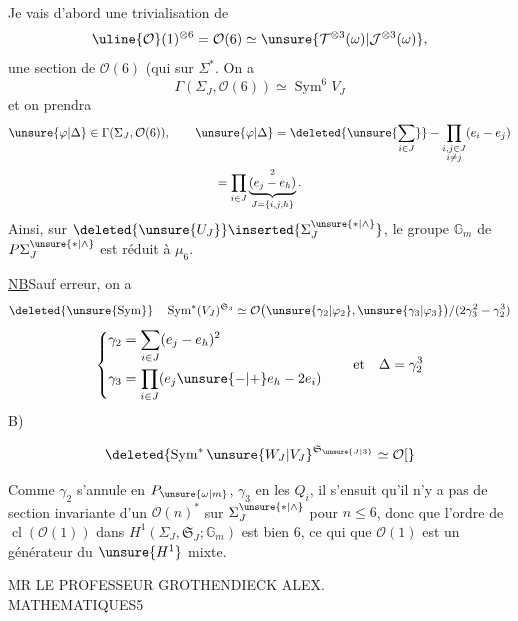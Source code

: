 Je vais d'abord  une trivialisation de
\[
\uline{\mathcal O}(1)^{\otimes6}=\mathcal O(6)\simeq
\unsure{\mathcal T^{\otimes3}(\omega)|\mathcal J^{\otimes3}(\omega)},
\]
  une section de $\mathcal O(6)$
(qui 
 sur $\Sigma^*$.
On  a
\[
\Gamma(\Sigma_J,\mathcal O(6))\simeq\operatorname{Sym}^{6}V_J
\]
et on prendra
\[
\begin{gathered}
\unsure{\varphi|\Delta}\in\Gamma(\Sigma_J,\mathcal O(6)),\qquad
\unsure{\varphi|\Delta}
=\deleted{\unsure{\sum_{i\in J}}}
-\prod_{\substack{i,j\in J\\i\ne j}}(e_i-e_j)\\
=\prod_{i\in J}\underbrace{(e_j-e_h)}_{J=\{i,j,h\}}^{2}.
\end{gathered}
\]
Ainsi, sur $\deleted{\unsure{U_J}}\inserted{\Sigma_J^{\unsure{*|\wedge}}}$, le groupe 
$\mathbb G_m$ de $P\Sigma_J^{\unsure{*|\wedge}}$ est réduit à $\mu_6$.

\uline{NB}\quad Sauf erreur, on a
\[
\deleted{\unsure{\operatorname{Sym}}}\quad
\operatorname{Sym}^{*}(V_J)^{\mathfrak S_3}\simeq
\mathcal O\bigl(\unsure{\gamma_2|\varphi_2},\unsure{\gamma_3|\varphi_3}\bigr)
/(2\gamma_3^2-\gamma_2^3)
\]
\[
\left\{\begin{aligned}
\gamma_2&=\sum_{i\in J}(e_j-e_h)^2\\
\gamma_3&=\prod_{i\in J}(e_j\unsure{-|+}e_h-2e_i)
\end{aligned}\right.
\qquad\text{et}\quad\Delta=\gamma_2^3
\]
B)

\[
\deleted{\operatorname{Sym}^{*}\unsure{W_J|V_J}^{\mathfrak S_{\unsure{J|3}}}\simeq\mathcal O[}
\]

Comme $\gamma_2$ s'annule en  $P_{\unsure{\omega|m}}$,
$\gamma_3$ en les $Q_i$, il s'ensuit qu'il n'y a pas de section invariante
d'un $\mathcal O(n)^*$  sur
$\Sigma_J^{\unsure{*|\wedge}}$ 
pour $n\le6$, donc que l'ordre de
$\operatorname{cl}(\mathcal O(1))$ dans
$H^1(\Sigma_J,\mathfrak S_J;\mathbb G_m)$ est bien $6$,
ce qui  que $\mathcal O(1)$ est un générateur du
$\unsure{H^1}$ mixte.
\begin{flushleft}
MR LE PROFESSEUR GROTHENDIECK ALEX.\\
MATHEMATIQUES\hfill 5
\end{flushleft}

